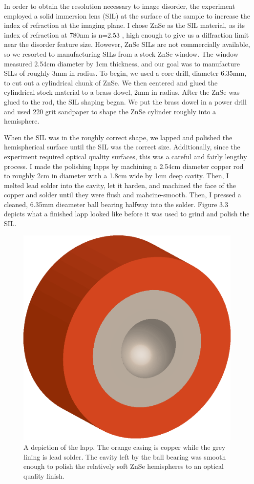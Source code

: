 \indent In order to obtain the resolution necessary to image disorder, the experiment employed a solid immersion lens (SIL) at the surface of the sample to increase the index of refraction at the imaging plane. I chose ZnSe as the SIL material, as its index of refraction at 780nm is n=2.53 \cite{refindex}, high enough to give us a diffraction limit near the disorder feature size. However, ZnSe SILs are not commercially available, so we resorted to manufacturing SILs from a stock ZnSe window. The window measured 2.54cm diameter by 1cm thickness, and our goal was to manufacture SILs of roughly 3mm in radius. To begin, we used a core drill, diameter 6.35mm, to cut out a cylindrical chunk of ZnSe. We then centered and glued the cylindrical stock material to a brass dowel, 2mm in radius. After the ZnSe was glued to the rod, the SIL shaping began. We put the brass dowel in a power drill and used 220 grit sandpaper to shape the ZnSe cylinder roughly into a hemisphere.

\indent  When the SIL was in the roughly correct shape, we lapped and polished the hemispherical surface until the SIL was the correct size. Additionally, since the experiment required optical quality surfaces, this was a careful and fairly lengthy process. I made the polishing lapps by machining a 2.54cm diameter copper rod to roughly 2cm in diameter with a 1.8cm wide by 1cm deep cavity. Then, I melted lead solder into the cavity, let it harden, and machined the face of the copper and solder until they were flush and mahcine-smooth. Then, I pressed a cleaned, 6.35mm dieameter ball bearing halfway into the solder. Figure 3.3 depicts what a finished lapp looked like before it was used to grind and polish the SIL. 

\begin{figure}[h!]
\centering
\includegraphics[width = .3\textwidth]{lapp.eps}
\caption{ \doublespacing A depiction of the lapp. The orange casing is copper while the grey lining is lead solder. The cavity left by the ball bearing was smooth enough to polish the relatively soft ZnSe hemispheres to an optical quality finish.}
\label{lapp}
\end{figure}



